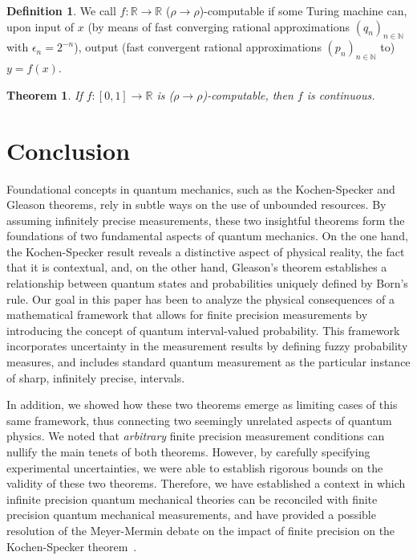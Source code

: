\documentclass[english,reprint, aps, prl,superscriptaddress, showpacs,
showkeys, longbibliography, amsmath, amssymb, floatfix]{revtex4-1}
\theoremstyle{plain}
\newtheorem{thm}{Theorem}
\theoremstyle{definition}
\newtheorem{definition}{Definition}
\newcommand{\says}[3]{\begin{framed}\begin{minipage}{0.9\linewidth}\color{#1}{#2 says: #3}\end{minipage}\end{framed}}
\newcommand{\yutsung}[1]{\says{purple}{Yu-Tsung}{#1}}
\newcommand{\andy}[1]{\says{blue}{Andy}{#1}}
\begin{document}
\begin{definition}
We call $f:\mathbb{R}\rightarrow\mathbb{R}$ ($\rho\rightarrow\rho$)-computable
if some Turing machine can, upon input of $x$ (by means of fast converging
rational approximations $\left(q_{n}\right)_{n\in\mathbb{N}}$ with
$\epsilon_{n}=2^{-n}$), output (fast convergent rational approximations
$\left(p_{n}\right)_{n\in\mathbb{N}}$ to) $y=f\left(x\right)$.
\end{definition}

\begin{thm}\label{thm:rho2rho-continuous}
If $f:\left[0,1\right]\rightarrow\mathbb{R}$ is
($\rho\rightarrow\rho$)-computable, then $f$ is continuous.
\end{thm}
\yutsung{End of comments}

\section{Conclusion}
\label{sec:Conclusion}
  
Foundational concepts in quantum mechanics, such as the Kochen-Specker
and Gleason theorems, rely in subtle ways on the use of
unbounded resources. By assuming infinitely precise measurements,
these two insightful theorems form the foundations of two fundamental aspects of
quantum mechanics. On the one hand, the Kochen-Specker result reveals a
distinctive aspect of physical reality, the fact that it is
contextual, and, on the other hand, Gleason's theorem establishes a
relationship between quantum states and probabilities uniquely defined
by Born's rule.  Our goal in this paper has been to analyze the
physical consequences of a mathematical framework that allows for
finite precision measurements by introducing the concept of quantum
interval-valued probability. This framework incorporates uncertainty
in the measurement results by defining fuzzy probability measures, and
includes standard quantum measurement as the particular instance of
sharp, infinitely precise, intervals.  

In addition, we showed how these two theorems emerge as limiting cases
of this same framework, thus connecting two seemingly unrelated
aspects of quantum physics. We noted that {\it arbitrary\/} finite
precision measurement conditions can nullify the main tenets of both
theorems. However, by carefully specifying experimental uncertainties,
we were able to establish rigorous bounds on the validity of these two
theorems. Therefore, we have established a context in which infinite
precision quantum mechanical theories can be reconciled with finite
precision quantum mechanical measurements, and have provided a
possible resolution of the Meyer-Mermin debate on the impact of finite
precision on the Kochen-Specker
theorem~\cite{PhysRevLett.83.3751,Mermin1999}.
\end{document}
